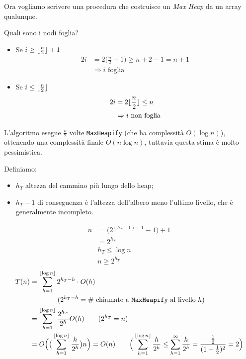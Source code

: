 Ora vogliamo scrivere una procedura che costruisce un \emph{Max Heap} da un array qualunque. \par
Quali sono i nodi foglia?
\begin{itemize}
	\item Se $i \geq \lfloor\frac{n}{2}\rfloor + 1$
	\begin{align*}
		2i & = 2\Big( \frac{n}{2} + 1 \Big) \geq n + 2 - 1 = n + 1 \\
		& \Rightarrow i \text{ foglia}
	\end{align*}
	\item Se $i \leq \lfloor\frac{n}{2}\rfloor$
	\begin{align*}
		2i & = 2 \lfloor\frac{n}{2}\rfloor \leq n \\
		& \Rightarrow i \text{ non foglia}
	\end{align*}
\end{itemize}


L'algoritmo esegue $\frac{n}{2}$ volte \texttt{MaxHeapify} (che ha complessità $O(\log n)$),
ottenendo una complessità finale $O(n \log n)$, 
tuttavia questa stima è molto pessimistica.\par
Definiamo: 
\begin{itemize}[noitemsep]
	\item $h_T$ altezza del cammino più lungo dello heap;
	\item $h_T - 1$ di conseguenza è l'altezza dell'albero meno l'ultimo livello, che è
	generalmente incompleto.
\end{itemize}

\begin{align*}
	n & = \Big( 2^{(h_T-1)+1} - 1\Big) + 1 \\
	& = 2^{h_T} \\
	& h_T \leq \log n \\
	& n \geq 2^{h_T}
\end{align*}
\begin{align*}
	T(n) & = \displaystyle\sum_{h = 1}^{\lfloor\log n\rfloor} 2^{h_T - h} \cdot O(h) \\
	& \hspace{1.4cm} (2^{h_T - h} = \text{\# chiamate a \texttt{MaxHeapify} al livello } h) \\
	& = \displaystyle\sum_{h = 1}^{\lfloor\log n\rfloor} \frac{2^{h_T}}{2^h}O(h) \qquad (2^{h_T} = n) \\
	& = O \Big( \big(\displaystyle\sum_{h = 1}^{\lfloor\log n\rfloor} \frac{h}{2^h} \big) n \Big) = O(n) 
		\qquad \Big( \displaystyle\sum_{h = 1}^{\lfloor\log n\rfloor} \frac{h}{2^h} \leq \displaystyle\sum_{h = 1}^{\infty} \frac{h}{2^h} 
		= \frac{\frac{1}{2}}{(1 - \frac{1}{2})^2} = 2 \Big)
\end{align*}

